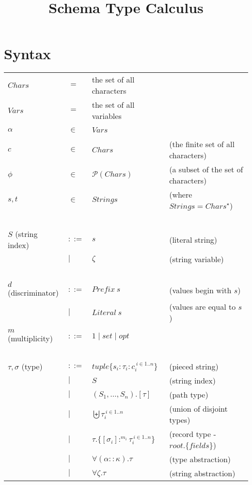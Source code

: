\documentclass{article}
\title{Schema Type Calculus}
\begin{document}
\maketitle

\section*{Syntax}

\begin{tabular}{llll}
$\mathit{Chars}$ & $=$ & the set of all characters \\
$\mathit{Vars}$ & $=$ & the set of all variables \\
$\alpha$ & $\in$ & $\mathit{Vars}$ & ~ \\
$c$ & $\in$ & $\mathit{Chars}$ & (the finite set of all characters) \\
$\phi$ & $\in$ & $\mathcal P(\mathit{Chars})$ & (a subset of the set of characters) \\
$s,t$ & $\in$ & $\mathit{Strings}$ & (where $\mathit{Strings} = \mathit{Chars}^{\star}$) \\~\\
$S$ (string index) & $::=$ & $s$ & (literal string) \\
                   & $\mid$ & $\zeta$ & (string variable) \\~\\
$d$ (discriminator) & $::=$  & $\mathit{Prefix}~s$ & (values begin with $s$) \\
    & $\mid$ & $\mathit{Literal}~s$ & (values are equal to $s$) \\
 & & \\
$m$ (multiplicity) & $::=$ & $1 \mid \mathit{set} \mid \mathit{opt}$\\~\\
$\tau,\sigma$ (type) & $::=$ & $\mathit{tuple} \{ s_i : \tau_i : c_i^{~i \in 1..n} \}$ & (pieced string) \\
       & $\mid$ & $S$ & (string index) \\
       & $\mid$ & $(S_1,\ldots,S_n).[\tau]$ & (path type) \\
       & $\mid$ & $\biguplus \tau_i^{~i \in 1..n}$ & (union of disjoint types) \\ 
       & $\mid$ & $\tau.\{[\sigma_i] :^{m_i} \tau_i ^{~i \in 1..n}\}$ & (record type - $\mathit{root}.\{ fields \}$) \\ 
       & $\mid$ & $\forall (\alpha :: \kappa). \tau$ & (type abstraction) \\
       & $\mid$ & $\forall \zeta. \tau$ & (string abstraction) \\

\end{tabular}
\end{document}

